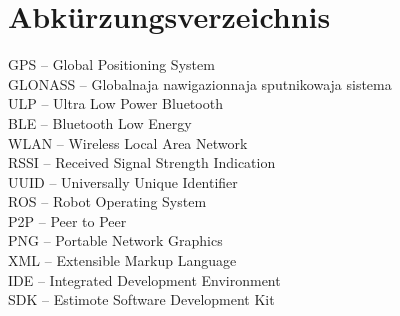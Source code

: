 \chapter*{Abkürzungsverzeichnis}

GPS -- Global Positioning System\\
GLONASS -- Globalnaja nawigazionnaja sputnikowaja sistema\\
ULP -- Ultra Low Power Bluetooth\\
BLE -- Bluetooth Low Energy\\
WLAN -- Wireless Local Area Network\\
RSSI -- Received Signal Strength Indication\\
UUID -- Universally Unique Identifier\\
ROS -- Robot Operating System\\
P2P -- Peer to Peer\\ 
PNG -- Portable Network Graphics\\
XML -- Extensible Markup Language\\
IDE -- Integrated Development Environment\\
SDK -- Estimote Software Development Kit\\
